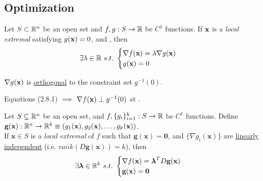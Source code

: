 \documentclass[11pt]{article}
\begin{document}
		\subsection{}
		\subsection{}
		\subsection{}
		\subsection{Optimization}
			\begin{theorem}
				Let $S \subset \mathbb{R}^n$ be an open set and $f, g: S \to \mathbb{R}$ be $C^1$ functions. If $\textbf{x}$ is a \emph{local extremal} satisfying $g(\textbf{x}) = 0$, and , then
				\begin{equation}
					\exists \lambda \in \mathbb{R}\ s.t.\ \begin{cases}
						\nabla f(\textbf{x}) = \lambda \nabla g(\textbf{x}) \\
						g(\textbf{x}) = 0
					\end{cases}
				\end{equation}
			\end{theorem}
			
			\begin{lemma}
				$\nabla g(\textbf{x})$ is \ul{orthogonal} to the constraint set $g^{-1}(0)$.
			\end{lemma}
			
			\begin{proposition}
				Equations (2.8.1) $\implies$ $\nabla f(\textbf{x}) \perp g^{-1}(0)$ at \tbf{x}.
			\end{proposition}
			
			\begin{theorem}
				Let $S \subseteq \mathbb{R}^n$ be an open set, and $f, \{g_i\}_{i=1}^k : S \to \mathbb{R}$ be $C^1$ functions. Define $\textbf{g}(\textbf{x}): \mathbb{R}^n \to \mathbb{R}^k \equiv (g_1(\textbf{x}), g_2(\textbf{x}), \dots, g_k(\textbf{x}))$. \\
				If $\textbf{x} \in S$ is a \emph{local extremal} of $f$ such that $\textbf{g}(\textbf{x}) = \textbf{0}$, and $\{\nabla g_i(\textbf{x})\}$ are \ul{linearly independent} (i.e. $rank(D\textbf{g}(\textbf{x})) = k$), then
				\begin{equation}
					\exists \boldsymbol{\lambda} \in \R^k\ s.t.\ \begin{cases}
						\nabla f(\textbf{x}) = \boldsymbol{\lambda}^T D\textbf{g}(\textbf{x}) \\
						\textbf{g}(\textbf{x}) =\textbf{0}
					\end{cases}
				\end{equation}
			\end{theorem}
			
\end{document}
